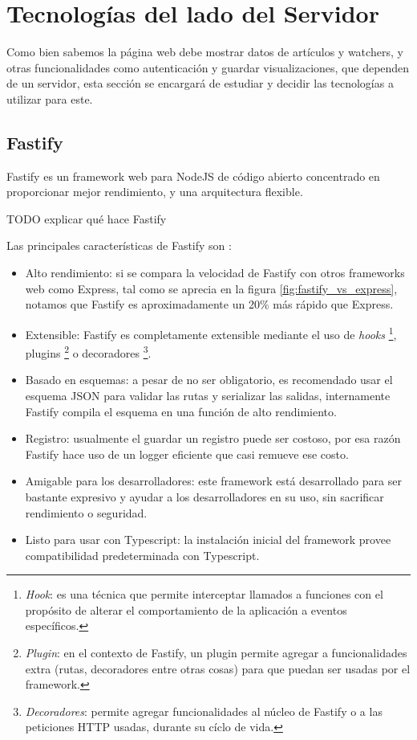 \section{Tecnologías del lado del Servidor}

Como bien sabemos la página web debe mostrar datos de artículos y watchers, y otras funcionalidades como autenticación y guardar visualizaciones, que dependen de un servidor, esta sección se encargará de estudiar y decidir las tecnologías a utilizar para este.

\subsection{Fastify}

Fastify es un framework web para NodeJS de código abierto concentrado en proporcionar mejor rendimiento, y una arquitectura flexible. 

TODO explicar qué hace Fastify

Las principales características de Fastify son \cite{FastifyCoreFeatures}:

\begin{itemize}
    \item Alto rendimiento: si se compara la velocidad de Fastify con otros frameworks web como Express, tal como se aprecia en la figura \ref{fig:fastify_vs_express}, notamos que Fastify es aproximadamente un 20\% más rápido que Express.
    \item Extensible: Fastify es completamente extensible mediante el uso de \textit{hooks} \footnote{\textit{Hook}: es una técnica que permite interceptar llamados a funciones con el propósito de alterar el comportamiento de la aplicación a eventos específicos.}, plugins \footnote{\textit{Plugin}: en el contexto de Fastify, un plugin permite agregar a funcionalidades extra (rutas, decoradores entre otras cosas) para que puedan ser usadas por el framework.} o decoradores \footnote{\textit{Decoradores}: permite agregar funcionalidades al núcleo de Fastify o a las peticiones HTTP usadas, durante su cíclo de vida.}.
    \item Basado en esquemas: a pesar de no ser obligatorio, es recomendado usar el esquema JSON para validar las rutas y serializar las salidas, internamente Fastify compila el esquema en una función de alto rendimiento.
    \item Registro: usualmente el guardar un registro puede ser costoso, por esa razón Fastify hace uso de un logger eficiente que casi remueve ese costo.
    \item Amigable para los desarrolladores: este framework está desarrollado para ser bastante expresivo y ayudar a los desarrolladores en su uso, sin sacrificar rendimiento o seguridad.
    \item Listo para usar con Typescript: la instalación inicial del framework provee compatibilidad predeterminada con Typescript.
\end{itemize}


